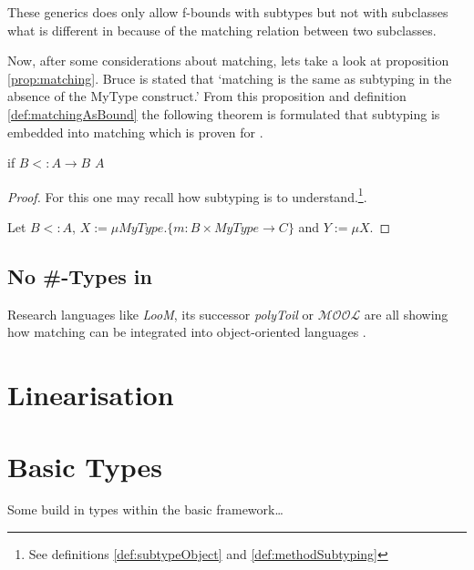 These generics does only allow f-bounds with subtypes but not with
subclasses what is different in \ooplss because of the matching relation
between two subclasses.

Now, after some considerations about matching, lets take a look at
proposition \ref{prop:matching}. Bruce is stated that `matching is
the same as subtyping in the absence of the MyType construct.' From
this proposition and definition \ref{def:matchingAsBound} the following
theorem is formulated that subtyping is embedded into matching which is
proven for \ooplss.

\begin{thm}
	\label{thm:matchinIsSubtyping}
	if $B <: A \rightarrow B$ \match $A$
\end{thm}

\begin{proof}
	For this one may recall how subtyping is to understand.\footnote{See
	definitions \ref{def:subtypeObject} and \ref{def:methodSubtyping}}.

	Let $B <: A$, $X := \mu MyType.\{m :
	B \times MyType \rightarrow C \} $ and $Y := \mu X.  $

%
\end{proof}


\subsection{No \#-Types in \ooplss}
Research languages like \emph{LooM}, its successor
\emph{polyToil} or $\mathcal{MOOL}$ are all showing how
matching can be integrated into object-oriented languages
\cite{bruce_subtyping_1997,bruce_polytoil:_1995,bruce_foundations_2002}.

\section{Linearisation}
\section{Basic Types}
Some build in types within the basic framework\ldots


